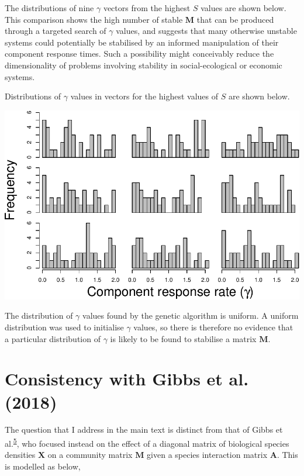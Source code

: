 \documentclass[]{article}
\begin{document}
The distributions of nine \(\gamma\) vectors from the highest \(S\)
values are shown below. This comparison shows the high number of stable
\(\mathbf{M}\) that can be produced through a targeted search of
\(\gamma\) values, and suggests that many otherwise unstable systems
could potentially be stabilised by an informed manipulation of their
component response times. Such a possibility might conceivably reduce
the dimensionality of problems involving stability in social-ecological
or economic systems.

Distributions of \(\gamma\) values in vectors for the highest values of
\(S\) are shown below.

\includegraphics{SI_files/figure-latex/unnamed-chunk-32-1.pdf}

The distribution of \(\gamma\) values found by the genetic algorithm is
uniform. A uniform distribution was used to initialise \(\gamma\)
values, so there is therefore no evidence that a particular distribution
of \(\gamma\) is likely to be found to stabilise a matrix
\(\mathbf{M}\).

\hypertarget{Gibbs}{\section{Consistency with Gibbs et al.
(2018)}\label{Gibbs}}

The question that I address in the main text is distinct from that of
Gibbs et al.\textsuperscript{\protect\hyperlink{ref-Gibbs2017}{5}}, who
focused instead on the effect of a diagonal matrix of biological species
densities \(\mathbf{X}\) on a community matrix \(\mathbf{M}\) given a
species interaction matrix \(\mathbf{A}\). This is modelled as below,
\end{document}
